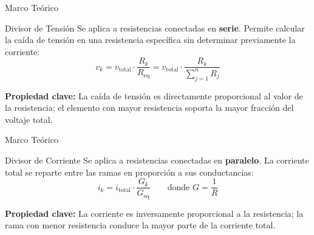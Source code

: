 \documentclass[10pt, aspectratio=169]{beamer}
\begin{document}
\primeraDiapo

\begin{frame}{Marco Teórico}
    \begin{boxTeoria}{Divisor de Tensión}
        Se aplica a resistencias conectadas en \textbf{serie}. Permite calcular la caída de tensión en una resistencia específica sin determinar previamente la corriente:
        \begin{equation*}
            v_k = v_{\text{total}} \cdot \frac{R_k}{R_{\text{eq}}} = v_{\text{total}} \cdot \frac{R_k}{\sum_{j=1}^{n} R_j}
        \end{equation*}

        \vspace{0.2cm}
        \textbf{Propiedad clave:} La caída de tensión es directamente proporcional al valor de la resistencia; el elemento con mayor resistencia soporta la mayor fracción del voltaje total.
    \end{boxTeoria}
\end{frame}

\begin{frame}{Marco Teórico}
    \begin{boxTeoria}{Divisor de Corriente}
        Se aplica a resistencias conectadas en \textbf{paralelo}. La corriente total se reparte entre las ramas en proporción a sus conductancias:
        \begin{equation*}
            i_k = i_{\text{total}} \cdot \frac{G_k}{G_{\text{eq}}} \qquad \text{donde }G=\frac{1}{R}
        \end{equation*}

        \vspace{0.2cm}
        \textbf{Propiedad clave:} La corriente es inversamente proporcional a la resistencia; la rama con menor resistencia conduce la mayor parte de la corriente total.
    \end{boxTeoria}
\end{frame}
\end{document}
